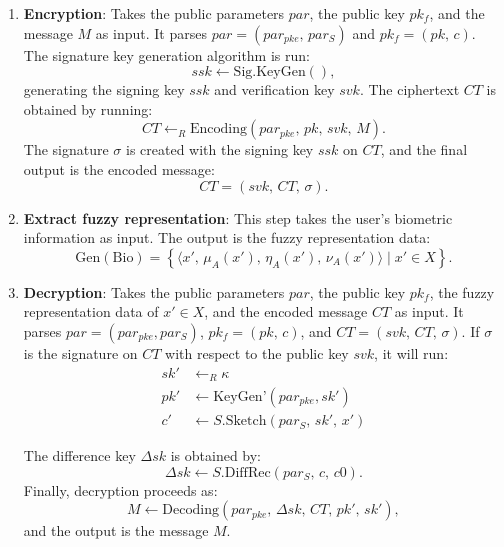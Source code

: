 \documentclass[graybox]{svmult}
\begin{document}
\begin{enumerate}
    \item \textbf{Encryption}: Takes the public parameters \(  par \), the public key \( pk_f \), and the message \( M \) as input. It parses \( par  = ( par_{pke}, \, par_S) \) and \( pk_f = (pk, \, c) \). The signature key generation algorithm is run:
          \begin{equation}
              ssk \leftarrow \text{Sig.KeyGen}(),
          \end{equation}
          generating the signing key $ssk$ and verification key $svk$. The ciphertext $CT$ is obtained by running:
          \begin{equation}
              CT \leftarrow_R \text{Encoding}(par_{pke}, \, pk, \, svk, \, M).
          \end{equation}
          The signature $\sigma$ is created with the signing key $ssk$ on $CT$, and the final output is the encoded message:
          \begin{equation}
              CT = (svk, \, CT, \, \sigma).
          \end{equation}

    \item \textbf{Extract fuzzy representation}: This step takes the user's biometric information as input. The output is the fuzzy representation data:
          \begin{equation}
              \text{Gen}(\text{Bio}) = \left\{ \langle x', \, \mu_A(x'), \, \eta_A(x'), \, \nu_A(x') \rangle \mid x' \in X \right\}.
          \end{equation}

    \item \textbf{Decryption}: Takes the public parameters \(  par \), the public key \( pk_f \), the fuzzy representation data of \( x' \in X \), and the encoded message \( CT \) as input. It parses \( par  = (par_{pke}, par_S) \), \( pk_f = (pk, \, c) \), and \( CT = (svk, \, CT, \, \sigma) \). If \( \sigma \) is the signature on \( CT \) with respect to the public key \( svk \), it will run:
          \begin{align}
              sk' & \leftarrow_R \kappa                              \\[6pt]
              pk' & \leftarrow \text{KeyGen'}(par_{pke}, sk')        \\[6pt]
              c'  & \leftarrow S.\text{Sketch}(par_S, \, sk', \, x')
          \end{align}

          The difference key \( \Delta sk \) is obtained by:
          \begin{equation}
              \Delta sk \leftarrow S.\text{DiffRec}(par_S, \, c, \, c0).
          \end{equation}
          Finally, decryption proceeds as:
          \begin{equation}
              M \leftarrow \text{Decoding}(par_{pke}, \, \Delta sk, \, CT, \, pk', \, sk'),
          \end{equation}
          and the output is the message \( M \).
\end{enumerate}
\end{document}
